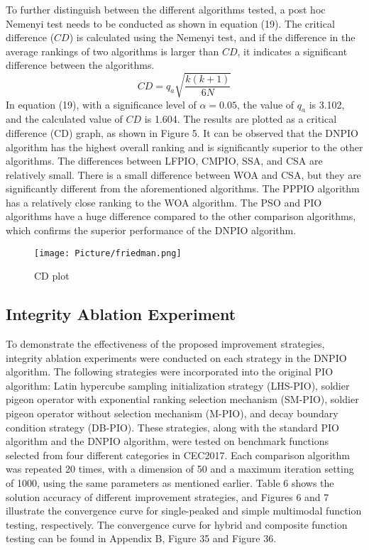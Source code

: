 \documentclass[preprint,review,compress,12pt]{elsarticle}
\begin{document}
To further distinguish between the different algorithms tested, a post hoc Nemenyi test\cite{nemenyi1963distribution} needs to be conducted as shown in equation (19). The critical difference ($CD$) is calculated using the Nemenyi test, and if the difference in the average rankings of two algorithms is larger than $CD$, it indicates a significant difference between the algorithms.
\begin{equation}
    CD = q_a\sqrt{\frac{k(k+1)}{6N} } 
\end{equation}
In equation (19), with a significance level of $\alpha=0.05$, the value of $q_a$ is 3.102, and the calculated value of $CD$ is 1.604. The results are plotted as a critical difference (CD) graph, as shown in Figure 5. It can be observed that the DNPIO algorithm has the highest overall ranking and is significantly superior to the other algorithms. The differences between LFPIO, CMPIO, SSA, and CSA are relatively small. There is a small difference between WOA and CSA, but they are significantly different from the aforementioned algorithms. The PPPIO algorithm has a relatively close ranking to the WOA algorithm. The PSO and PIO algorithms have a huge difference compared to the other comparison algorithms, which confirms the superior performance of the DNPIO algorithm.

\begin{figure}[H]
\centering
\texttt{[image: Picture/friedman.png]}
\caption{CD plot}
\label{fig1}
\end{figure}


\subsection{Integrity Ablation Experiment} To demonstrate the effectiveness of the proposed improvement strategies, integrity ablation experiments were conducted on each strategy in the DNPIO algorithm. The following strategies were incorporated into the original PIO algorithm: Latin hypercube sampling initialization strategy (LHS-PIO), soldier pigeon operator with exponential ranking selection mechanism (SM-PIO), soldier pigeon operator without selection mechanism (M-PIO), and decay boundary condition strategy (DB-PIO). These strategies, along with the standard PIO algorithm and the DNPIO algorithm, were tested on benchmark functions selected from four different categories in CEC2017. Each comparison algorithm was repeated 20 times, with a dimension of 50 and a maximum iteration setting of 1000, using the same parameters as mentioned earlier. Table 6 shows the solution accuracy of different improvement strategies, and Figures 6 and 7 illustrate the convergence curve for single-peaked and simple multimodal function testing, respectively. The convergence curve for hybrid and composite function testing can be found in Appendix B, Figure 35 and Figure 36.
\end{document}
